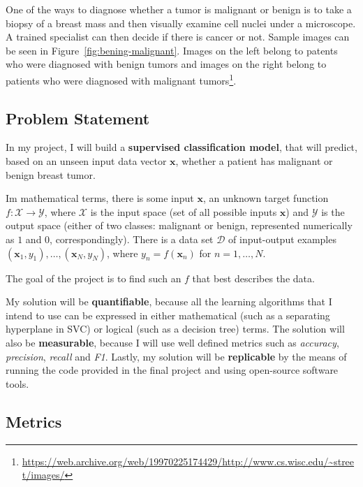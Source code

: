 \documentclass[10pt, a4paper]{article}
\begin{document}
One of the ways to diagnose whether a tumor is malignant or benign is to take a biopsy of a breast mass and then visually examine cell nuclei under a microscope. A trained specialist can then decide if there is cancer or not. Sample images can be seen in Figure~\ref{fig:bening-malignant}. Images on the left belong to patents who were diagnosed with benign tumors and images on the right belong to patients who were diagnosed with malignant tumors\footnote{\scriptsize \url{https://web.archive.org/web/19970225174429/http://www.cs.wisc.edu/~street/images/}}.

\subsection{Problem Statement}

In my project, I will build a \textbf{supervised classification model}, that will predict, based on an unseen input data vector $\textbf{x}$, whether a patient has malignant or benign breast tumor. 

Im mathematical terms, there is some input $\textbf{x}$, an unknown target function $f:\mathcal{X}\rightarrow \mathcal{Y}$, where $\mathcal{X}$ is the input space (set of all possible inputs $\textbf{x}$) and $\mathcal{Y}$ is the output space (either of two classes: malignant or benign, represented numerically as $1$ and $0$, correspondingly). There is a data set $\mathcal{D}$ of input-output examples $(\textbf{x}_1,y_1),\dots,(\textbf{x}_N,y_N)$, where $y_n = f(\textbf{x}_n)$ for $n = 1, \dots, N$. 

The goal of the project is to find such an $f$ that best describes the data.

My solution will be \textbf{quantifiable}, because all the learning algorithms that I intend to use can be expressed in either mathematical (such as a separating hyperplane in SVC) or logical (such as a decision tree) terms. The solution will also be \textbf{measurable}, because I will use well defined metrics such as \textit{accuracy}, \textit{precision}, \textit{recall} and \textit{F1}. Lastly, my solution will be \textbf{replicable} by the means of running the code provided in the final project and using open-source software tools.

\subsection{Metrics}
\label{subsec:metrics}
\end{document}
